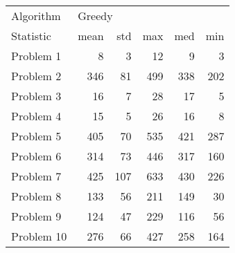 \begin{tabular}{lrrrrr}
\toprule
Algorithm & \multicolumn{5}{l}{Greedy} \\
Statistic &   mean &  std &  max &  med &  min \\
\midrule
Problem 1  &      8 &    3 &   12 &    9 &    3 \\
Problem 2  &    346 &   81 &  499 &  338 &  202 \\
Problem 3  &     16 &    7 &   28 &   17 &    5 \\
Problem 4  &     15 &    5 &   26 &   16 &    8 \\
Problem 5  &    405 &   70 &  535 &  421 &  287 \\
Problem 6  &    314 &   73 &  446 &  317 &  160 \\
Problem 7  &    425 &  107 &  633 &  430 &  226 \\
Problem 8  &    133 &   56 &  211 &  149 &   30 \\
Problem 9  &    124 &   47 &  229 &  116 &   56 \\
Problem 10 &    276 &   66 &  427 &  258 &  164 \\
\bottomrule
\end{tabular}
